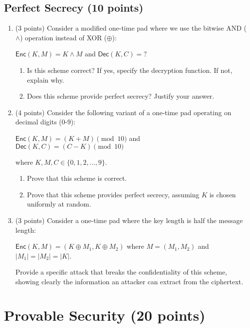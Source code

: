 \documentclass[10pt,a4paper,american]{article}
\begin{document}
\subsection{Perfect Secrecy (10 points)}

\begin{enumerate}
	\item (3 points) Consider a modified one-time pad where we use the bitwise AND ($\land$) operation instead of XOR ($\oplus$):

	      $\textsf{Enc}(K, M) = K \land M$ and $\textsf{Dec}(K, C) = ?$

	      \begin{enumerate}
		      \item Is this scheme correct? If yes, specify the decryption function. If not, explain why.
		      \item Does this scheme provide perfect secrecy? Justify your answer.
	      \end{enumerate}

	\item (4 points) Consider the following variant of a one-time pad operating on decimal digits (0-9):

	      $\textsf{Enc}(K, M) = (K + M) \pmod{10}$ and $\textsf{Dec}(K, C) = (C - K) \pmod{10}$

	      where $K, M, C \in \{0, 1, 2, \ldots, 9\}$.

	      \begin{enumerate}
		      \item Prove that this scheme is correct.
		      \item Prove that this scheme provides perfect secrecy, assuming $K$ is chosen uniformly at random.
	      \end{enumerate}

	\item (3 points) Consider a one-time pad where the key length is half the message length:

	      $\textsf{Enc}(K, M) = (K \oplus M_1, K \oplus M_2)$ where $M = (M_1, M_2)$ and $|M_1| = |M_2| = |K|$.

	      Provide a specific attack that breaks the confidentiality of this scheme, showing clearly the information an attacker can extract from the ciphertext.
\end{enumerate}

\section{Provable Security (20 points)}
\end{document}
